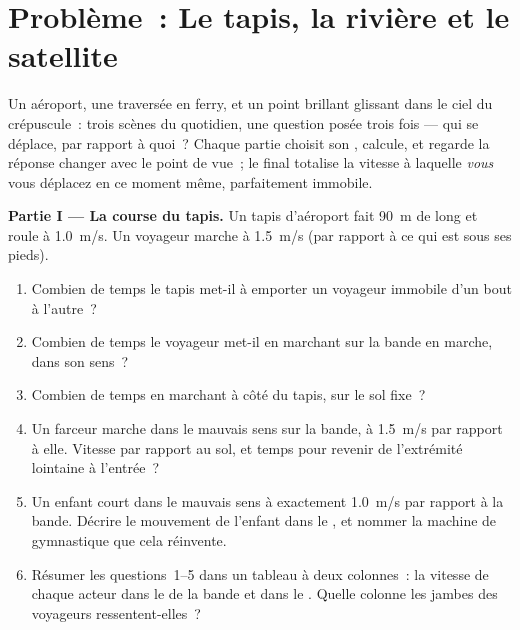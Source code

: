 \section{Problème~: Le tapis, la rivière et le satellite}

\begin{problem}
\label{pb:g10:relative-motion:1}
Un aéroport, une traversée en ferry, et un point brillant glissant
dans le ciel du crépuscule~: trois scènes du quotidien, une question
posée trois fois --- qui se déplace, par rapport à quoi~? Chaque
partie choisit son , calcule, et regarde la réponse changer
avec le point de vue~; le final totalise la vitesse à laquelle
\emph{vous} vous déplacez en ce moment même, parfaitement immobile.

\medskip
\noindent\textbf{Partie I --- La course du tapis.}
Un tapis d'aéroport fait \qty{90}{m} de long et roule à
\qty{1.0}{m/s}. Un voyageur marche à \qty{1.5}{m/s} (par rapport à ce
qui est sous ses pieds).
\begin{enumerate}
  \item Combien de temps le tapis met-il à emporter un voyageur
        immobile d'un bout à l'autre~?
  \item Combien de temps le voyageur met-il en marchant sur la bande
        en marche, dans son sens~?
  \item Combien de temps en marchant à côté du tapis, sur le sol fixe~?
  \item Un farceur marche dans le mauvais sens sur la bande, à
        \qty{1.5}{m/s} par rapport à elle. Vitesse par rapport au sol,
        et temps pour revenir de l'extrémité lointaine à l'entrée~?
  \item Un enfant court dans le mauvais sens à exactement
        \qty{1.0}{m/s} par rapport à la bande. Décrire le mouvement de
        l'enfant dans le , et nommer la machine
        de gymnastique que cela réinvente.
  \item Résumer les questions~1--5 dans un tableau à deux colonnes~:
        la vitesse de chaque acteur dans le  de la bande et
        dans le . Quelle colonne les jambes
        des voyageurs ressentent-elles~?
\end{enumerate}


\end{problem}
